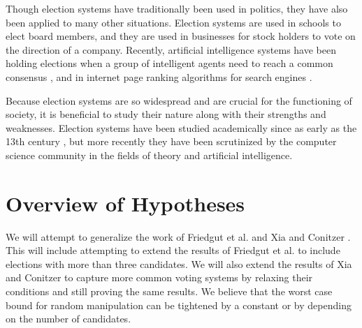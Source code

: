 Though election systems have traditionally been used in politics, they have also been applied to many other situations. Election systems are used in schools to elect board members, and they are used in businesses for stock holders to vote on the direction of a company. Recently, artificial intelligence systems have been holding elections when a group of intelligent agents need to reach a common consensus \cite{ephrati1991clarke, ephrati1993multi, pennock2000social, dwork2001rank, fagin2003efficient}, and in internet page ranking algorithms for search engines \cite{chevaleyre2007short}.

Because election systems are so widespread and are crucial for the functioning of society, it is beneficial to study their nature along with their strengths and weaknesses. Election systems have been studied academically since as early as the 13th century \cite{hägele2001llull}, but more recently they have been scrutinized by the computer science community in the fields of theory and artificial intelligence.


\section{Overview of Hypotheses}

We will attempt to generalize the work of Friedgut et al. \cite{friedgut2008elections} and Xia and Conitzer \cite{xia2008sufficient}. This will include attempting to extend the results of Friedgut et al. \cite{friedgut2008elections} to include elections with more than three candidates. We will also extend the results of Xia and Conitzer \cite{xia2008sufficient} to capture more common voting systems by relaxing their conditions and still proving the same results. We believe that the worst case bound for random manipulation can be tightened by a constant or by depending on the number of candidates.
